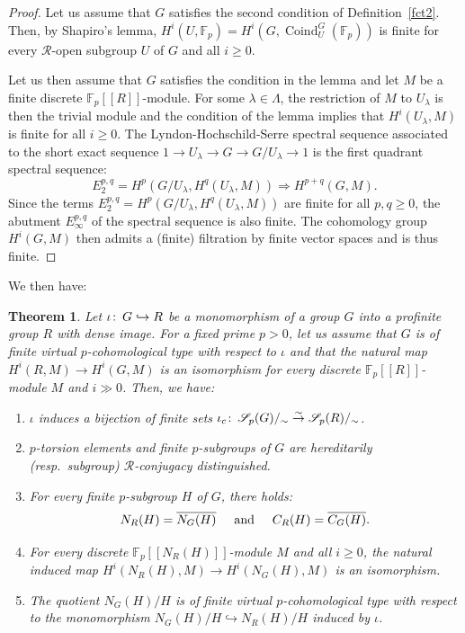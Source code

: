 \documentclass[12pt,twoside]{amsart}
\newcommand\F{{\mathbb F}}
\newcommand\cR{{\mathcal R}}
\newcommand\Ra{\Rightarrow}
\newcommand\hookra{\hookrightarrow}
\newcommand\sr{\stackrel}
\newcommand\ol{\overline}
\newcommand\cS{{\mathscr S}}
\newcommand\ld{\lambda}
\newcommand\Ld{\Lambda}
\def\co{\colon\thinspace}
\newtheorem{theorem}{Theorem}[section]
\theoremstyle{definition}
\begin{document}
\begin{proof}Let us assume that $G$ satisfies the second condition of Definition~\ref{fct2}. Then, by Shapiro's lemma, 
$H^i(U,\F_p)=H^i(G,\operatorname{Coind}^G_U(\F_p))$ is finite for every $\cR$-open subgroup $U$ of $G$ and all $i\geq 0$. 

Let us then assume that $G$ satisfies the condition in the lemma and let $M$ be a finite discrete $\F_p[[R]]$-module.
For some $\ld\in\Ld$, the restriction of $M$ to $U_\ld$ is then the trivial module and
the condition of the lemma implies that $H^i(U_\ld,M)$ is finite for all $i\geq 0$. The Lyndon-Hochschild-Serre spectral sequence
associated to the short exact sequence $1\to U_\ld\to G\to G/U_\ld\to 1$ is the first quadrant spectral sequence:
\[E_2^{p,q}=H^p(G/U_\ld,H^q(U_\ld,M))\Ra H^{p+q}(G,M).\]
Since the terms $E_2^{p,q}=H^p(G/U_\ld,H^q(U_\ld,M))$ are finite for all $p,q\geq 0$, the abutment $E_\infty^{p,q}$ of the spectral sequence is also finite. 
The cohomology group $H^i(G,M)$ then admits a (finite) filtration by finite vector spaces and is thus finite.
\end{proof}

We then have:

\begin{theorem}\label{pcase}Let  $\iota\co G\hookra R$ be a monomorphism of a group $G$ into a profinite group $R$ with dense image. 
For a fixed prime $p>0$, let us assume that $G$ is of finite virtual $p$-cohomological type with respect to $\iota$ and that
the natural map $H^i(R,M)\to H^i(G, M)$ is an isomorphism for every discrete $\F_p[[R]]$-module $M$ and $i\gg 0$. Then, we have: 
\begin{enumerate}
\item $\iota$ induces a bijection of finite sets $\iota_c\co\cS_p(G)/_{\sim}\sr{\sim}{\to}\cS_p(R)/_{\sim}$. 
\item $p$-torsion elements and finite $p$-subgroups of $G$ are hereditarily (resp.\ subgroup) $\cR$-conjugacy distinguished.
\item For every finite $p$-subgroup $H$ of $G$, there holds: 
\[N_{R}(H)=\ol{N_G(H)}\hspace{0.5cm} \mbox{and}\hspace{0.5cm} C_{R}(H)=\ol{C_G(H)}.\]
\item For every discrete $\F_p[[N_{R}(H)]]$-module $M$ and all $i\geq 0$, 
the natural induced map $H^i(N_{R}(H),M)\to H^i(N_G(H), M)$ is an isomorphism. 
\item The quotient $N_G(H)/H$ is of finite virtual $p$-cohomological type with respect to the monomorphism $N_G(H)/H\hookra N_{R}(H)/H$
induced by $\iota$.
\end{enumerate}
\end{theorem}
\end{document}
